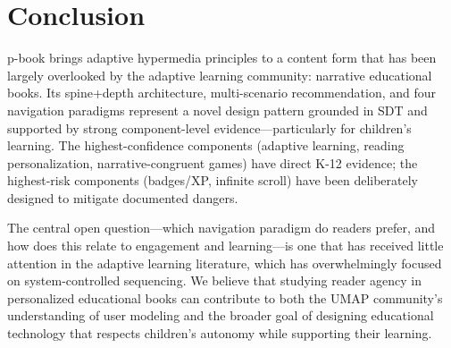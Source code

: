 \documentclass[11pt,a4paper]{article}
\begin{document}
\section{Conclusion}

p-book brings adaptive hypermedia principles to a content form that has been largely overlooked by the adaptive learning community: narrative educational books. Its spine+depth architecture, multi-scenario recommendation, and four navigation paradigms represent a novel design pattern grounded in SDT and supported by strong component-level evidence---particularly for children's learning. The highest-confidence components (adaptive learning, reading personalization, narrative-congruent games) have direct K-12 evidence; the highest-risk components (badges/XP, infinite scroll) have been deliberately designed to mitigate documented dangers.

The central open question---which navigation paradigm do readers prefer, and how does this relate to engagement and learning---is one that has received little attention in the adaptive learning literature, which has overwhelmingly focused on system-controlled sequencing. We believe that studying reader agency in personalized educational books can contribute to both the UMAP community's understanding of user modeling and the broader goal of designing educational technology that respects children's autonomy while supporting their learning.
\end{document}
